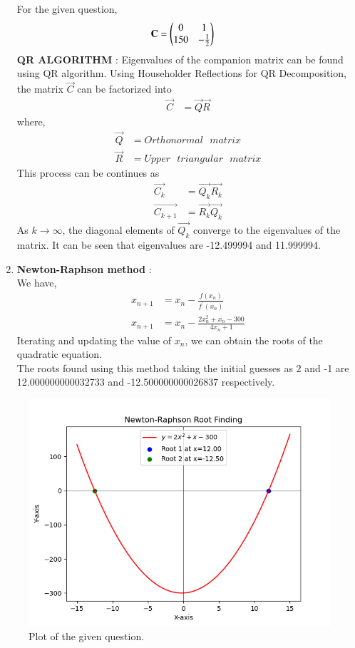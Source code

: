 \documentclass[journal]{IEEEtran}
\begin{document}
\begin{enumerate}
	For the given question, 
	\begin{align}
		\mathbf{C} &= \begin{pmatrix}0 & 1 \\ 150 & -\frac{1}{2}\end{pmatrix}
	\end{align}
	\textbf{QR ALGORITHM} :
	Eigenvalues of the companion matrix can be found using QR algorithm. Using Householder Reflections for QR Decomposition, the matrix $\vec{C}$ can be factorized into
	\begin{align}
		\vec{C} &= \vec{Q} \vec{R}
	\end{align}
	where, 
	\begin{align}
		\vec{Q} &= Orthonormal \text{ }matrix \\
		\vec{R} &= Upper\text{ } triangular \text{ }matrix
	\end{align}
	This process can be continues as
	\begin{align}
		\vec{C_{k}} &= \vec{Q_{k}} \vec{R_{k}} \\
		\vec{C_{k+1}} &= \vec{R_{k}} \vec{Q_{k}}
	\end{align}
	As $k \to \infty$, the diagonal elements of $\vec{Q_{k}}$ converge to the eigenvalues of the matrix.
	It can be seen that eigenvalues are -12.499994 and  11.999994.
	\item \textbf{Newton-Raphson method} : \\
		We have, 
		\begin{align}
			x_{n+1} &= x_{n} - \frac{f(x_{n})}{f^{\prime}(x_{n})}	\\
			x_{n+1} &= x_{n} - \frac{2x_{n}^2 +x_{n} - 300}{4x_{n} + 1}
		\end{align}
		Iterating and updating the value of $x_{n}$, we can obtain the roots of the quadratic equation. \\
		The roots found using this method taking the initial guesses as 2 and -1 are 12.000000000032733 and -12.500000000026837
 respectively.
 
\end{enumerate}
\begin{figure}[h]
\centering
\includegraphics[width=\columnwidth]{figs/fig.png}
\caption{Plot of the given question.}
\label{fig:Plot1} 
\end{figure}
\end{document}
